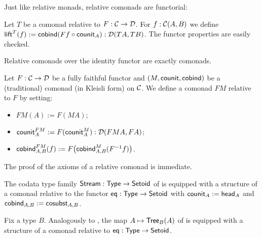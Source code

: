 \documentclass[envcountsame]{llncs}
\begin{document}
\begin{Long}
Just like relative monads, relative comonads are functorial:
\begin{definition}%
\label{def:lift}
 Let $T$ be a  comonad relative to $F:\C\to\D$.
 For $f : \C(A,B)$ we define
  $ \lift^T(f) := \cobind(\comp{\counit_A}{Ff}) : \D(TA,TB)$. 
 The functor properties are easily checked.
\end{definition}
\end{Long}

\begin{Long}
Relative comonads over the identity functor are exactly comonads.
\end{Long}



\begin{Long}

\begin{example}\label{ex_relcom_from_com}
  Let $F : \C \to \D$ be a fully faithful functor and $(M,\counit,\cobind)$ be a (traditional) comonad (in Kleisli form) on $\C$.
  We define a comonad $FM$ relative to $F$ by setting:
  \begin{itemize}
   \item $FM(A) := F(MA)$;
   \item $\counit^{FM}_A := F(\counit^M_A) : \D(FMA,FA)$;
   \item $\cobind^{FM}_{A,B} (f) := F\bigl(\cobind^M_{A,B}(F^{-1}f)\bigr)$.
  \end{itemize}
  The proof of the axioms of a relative comonad is immediate.
\end{example}

\end{Long}

\begin{example}[Streams]\label{ex_stream_comonad}
  The codata type family $\stream : \Set \to \Setoid$ of  is equipped with a structure of a comonad relative to the functor 
  $\eq : \Set \to \Setoid$ with
   $\counit_A := \shead_A$ and
   $\cobind_{A,B} := \sredec_{A,B}$.
\end{example}


\begin{Long}

\begin{example}[Trees]\label{ex_tree_comonad}
 Fix a type $B$. Analogously to , the map $A \mapsto \Tree_B(A)$ of 
 is equipped with a structure of a comonad relative to $\eq: \Set\to\Setoid$.
\end{example}

\end{Long}
\end{document}
